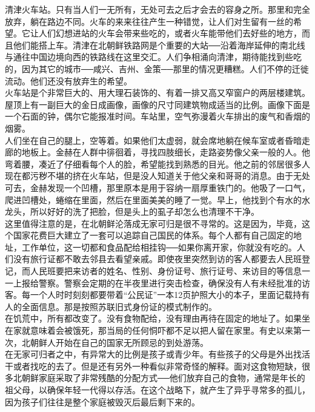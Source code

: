 清津火车站。只有当人们一无所有，无处可去之后才会去的容身之所。那里和完全放弃，躺在路边不同。火车的来来往往产生一种错觉，让人们对生留有一丝的希望。它让人们幻想进站的火车会带来些吃的，或者火车能带他们去好些的地方，而且他们能搭上车。清津在北朝鲜铁路网是个重要的大站──沿着海岸延伸的南北线与通往中国边境向西的铁路线在这里交汇。人们争相涌向清津，期待能找到些吃的，因为其它的城市──咸兴、吉州、金策──那里的情况更糟糕。人们不停的迁徙流动。他们还没有放弃生的希望。\\

火车站是个非常巨大的、用大理石装饰的、有着一排又高又窄窗户的两层楼建筑。屋顶上有一副巨大的金日成画像，画像的尺寸同建筑物成适当的比例。画像下面是一个石面的钟，偶尔它能报准时间。车站里，空气弥漫着火车排出的废气和香烟的烟雾。\\

人们坐在自己的腿上，空等着。如果他们太虚弱，就会席地躺在候车室或者昏暗走廊的地板上。金赫在人群中徘徊着，寻找四肢细长，走路姿势像父亲一般的人。他弯着腰，凑近了仔细看每个人的脸，希望能找到熟悉的目光。他之前的邻居很多人现在都污秽不堪的挤在火车站，但是没人知道关于他父亲和哥哥的消息。由于无处可去，金赫发现一个凹槽，那里原本是用于容纳一扇厚重铁门的。他吸了一口气，爬进凹槽处，蜷缩在里面，然后在里面美美的睡了一觉。早上，他找到个有水的水龙头，所以好好的洗了把脸，但是头上的虱子却怎么也清理不干净。\\

这里值得注意的是，在北朝鲜沦落成无家可归是很不寻常的。这是因为，毕竟，这个国家花费巨大建立了一套可以追踪自己国民的体系。每个人都有自己固定的地址，工作单位，这一切都和食品配给相挂钩──如果你离开家，你就没有吃的。人们没有旅行证都不敢去邻县去看望亲戚。即使夜里突然到访的客人都要去人民班登记，而人民班要把来访者的姓名、性别、身份证号、旅行证号、来访目的等信息一一上报给警察。警察会定期的在半夜里进行突击检查，确保没有人有未经批准的访客。每一个人时时刻刻都要带着“公民证”一本12页护照大小的本子，里面记载持有人的全面信息。那是按照苏联旧式身份证的模式制作的。\\

在饥荒中，所有都改变了。没有食物配给，没有理由再待在固定的地址了。如果坐在家就意味着会被饿死，那当局的任何恫吓都不足以把人留在家里。有史以来第一次，北朝鲜人开始在自己的国家无所顾忌的到处游荡。\\

在无家可归者之中，有异常大的比例是孩子或青少年。有些孩子的父母是外出找活干或者找吃的去了。但是还有另外一种看似非常奇怪的解释。面对这食物短缺，很多北朝鲜家庭采取了非常残酷的分配方式──他们放弃自己的食物，通常是年长的祖父母，以确保年轻一代得以存活。在这个战略下，就产生了异乎寻常多的孤儿，因为孩子们往往是整个家庭被毁灭后最后剩下来的。\\


